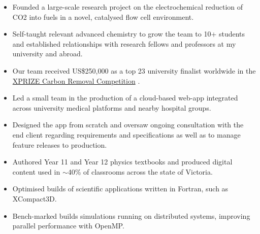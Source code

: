 \documentclass[9pt,a4paper,ragged2e]{altacv}
\begin{document}
\begin{paracol}{2}
	\begin{itemize}
		\item Founded a large-scale research project on the electrochemical reduction of CO2 into fuels in a novel, catalysed flow cell environment.
		\item Self-taught relevant advanced chemistry to grow the team to 10+ students and established relationships with research fellows and professors at my university and abroad.
		\item Our team received US\$250,000 as a top 23 university finalist worldwide in the \href{https://www.xprize.org/prizes/carbonremoval}{XPRIZE Carbon Removal Competition} \faLink.
	\end{itemize}

	\divider

	\begin{itemize}
		\item Led a small team in the production of a cloud-based web-app integrated across university medical platforms and nearby hospital groups.
		\item Designed the app from scratch and oversaw ongoing consultation with the end client regarding requirements and specifications as well as to manage feature releases to production.
	\end{itemize}

	\divider

	\begin{itemize}
		\item Authored Year 11 and Year 12 physics textbooks and produced digital content used in $\sim$40\% of classrooms across the state of Victoria.
	\end{itemize}

	\begin{itemize}
		\item Optimised builds of scientific applications written in Fortran, such as XCompact3D.
		\item Bench-marked builds simulations running on distributed systems, improving parallel performance with OpenMP.
	\end{itemize}


\end{paracol}
\end{document}
